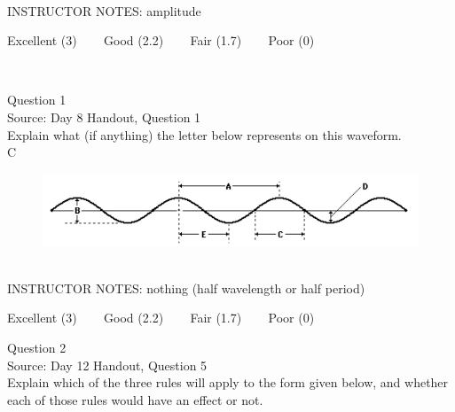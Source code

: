 \documentclass[12pt]{article}
\begin{document}
~\\
INSTRUCTOR NOTES: amplitude


\vfill
Excellent (3) ~~~ Good (2.2) ~~~ Fair (1.7) ~~~ Poor (0)
\newpage

\begin{center}
\textbf{{\color{red}{\HUGE END OF EXAM}}}\\

\end{center}
\newpage

\begin{center}
\textbf{{\color{blue}{\HUGE START OF EXAM\\}}}

\textbf{{\color{blue}{\HUGE Student ID: 9376\\}}}

\textbf{{\color{blue}{\HUGE 4:20 - 4:40 PM\\}}}

\end{center}
\newpage

{\large Question 1}\\

Source: Day 8 Handout, Question 1\\

Explain what (if anything) the letter below represents on this waveform.\\

C

\begin{figure}[H]
\includegraphics{../images/sinusoid.png}
\end{figure}

~\\
INSTRUCTOR NOTES: nothing (half wavelength or half period)


\vfill
Excellent (3) ~~~ Good (2.2) ~~~ Fair (1.7) ~~~ Poor (0)
\newpage

{\large Question 2}\\

Source: Day 12 Handout, Question 5\\

Explain which of the three rules will apply to the form given below, and whether each of those rules would have an effect or not.\\
\end{document}
